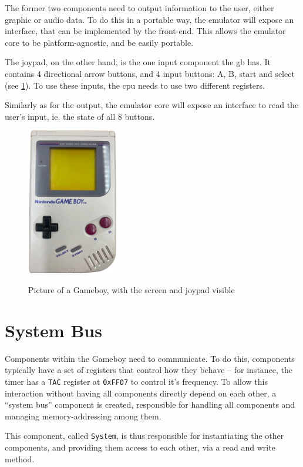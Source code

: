\documentclass[11pt]{informatics-report}
\begin{document}
The former two components need to output information to the user, either graphic or audio data. To do this in a portable way, the emulator will expose an interface, that can be implemented by the front-end. This allows the emulator core to be platform-agnostic, and be easily portable.

The joypad, on the other hand, is the one input component the \gls{gb} has. It contains 4 directional arrow buttons, and 4 input buttons: A, B, start and select (see \ref{fig:gb-front}). To use these inputs, the \gls{cpu} needs to use two different registers.

Similarly as for the output, the emulator core will expose an interface to read  the user's input, ie. the state of all 8 buttons.

\begin{figure}[h]
    \centering
    \includegraphics[width=4cm]{images/gameboy}\\
    \caption{Picture of a Gameboy, with the screen and joypad visible}
    \label{fig:gb-front}
\end{figure}

\section{System Bus}

Components within the Gameboy need to communicate. To do this, components typically have a set of registers that control how they behave -- for instance, the timer has a \texttt{TAC} register at \texttt{0xFF07} to control it's frequency. To allow this interaction without having all components directly depend on each other, a ``system bus'' component is created, responsible for handling all components and managing memory-addressing among them.

This component, called \texttt{System}, is thus responsible for instantiating the other components, and providing them access to each other, via a read and write method.
\end{document}
